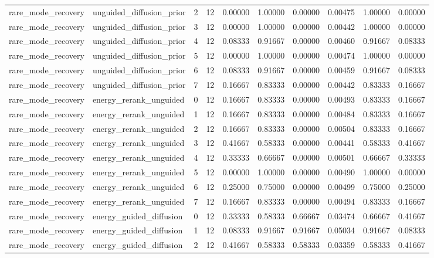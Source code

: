 \documentclass{article}
\begin{document}
\begin{table}[tbp]
{\begin{tabular}{llllllllll}
rare\_mode\_recovery & unguided\_diffusion\_prior & 2 & 12 & 0.00000 & 1.00000 & 0.00000 & 0.00475 & 1.00000 & 0.00000 \\
rare\_mode\_recovery & unguided\_diffusion\_prior & 3 & 12 & 0.00000 & 1.00000 & 0.00000 & 0.00442 & 1.00000 & 0.00000 \\
rare\_mode\_recovery & unguided\_diffusion\_prior & 4 & 12 & 0.08333 & 0.91667 & 0.00000 & 0.00460 & 0.91667 & 0.08333 \\
rare\_mode\_recovery & unguided\_diffusion\_prior & 5 & 12 & 0.00000 & 1.00000 & 0.00000 & 0.00474 & 1.00000 & 0.00000 \\
rare\_mode\_recovery & unguided\_diffusion\_prior & 6 & 12 & 0.08333 & 0.91667 & 0.00000 & 0.00459 & 0.91667 & 0.08333 \\
rare\_mode\_recovery & unguided\_diffusion\_prior & 7 & 12 & 0.16667 & 0.83333 & 0.00000 & 0.00442 & 0.83333 & 0.16667 \\
rare\_mode\_recovery & energy\_rerank\_unguided & 0 & 12 & 0.16667 & 0.83333 & 0.00000 & 0.00493 & 0.83333 & 0.16667 \\
rare\_mode\_recovery & energy\_rerank\_unguided & 1 & 12 & 0.16667 & 0.83333 & 0.00000 & 0.00484 & 0.83333 & 0.16667 \\
rare\_mode\_recovery & energy\_rerank\_unguided & 2 & 12 & 0.16667 & 0.83333 & 0.00000 & 0.00504 & 0.83333 & 0.16667 \\
rare\_mode\_recovery & energy\_rerank\_unguided & 3 & 12 & 0.41667 & 0.58333 & 0.00000 & 0.00441 & 0.58333 & 0.41667 \\
rare\_mode\_recovery & energy\_rerank\_unguided & 4 & 12 & 0.33333 & 0.66667 & 0.00000 & 0.00501 & 0.66667 & 0.33333 \\
rare\_mode\_recovery & energy\_rerank\_unguided & 5 & 12 & 0.00000 & 1.00000 & 0.00000 & 0.00490 & 1.00000 & 0.00000 \\
rare\_mode\_recovery & energy\_rerank\_unguided & 6 & 12 & 0.25000 & 0.75000 & 0.00000 & 0.00499 & 0.75000 & 0.25000 \\
rare\_mode\_recovery & energy\_rerank\_unguided & 7 & 12 & 0.16667 & 0.83333 & 0.00000 & 0.00494 & 0.83333 & 0.16667 \\
rare\_mode\_recovery & energy\_guided\_diffusion & 0 & 12 & 0.33333 & 0.58333 & 0.66667 & 0.03474 & 0.66667 & 0.41667 \\
rare\_mode\_recovery & energy\_guided\_diffusion & 1 & 12 & 0.08333 & 0.91667 & 0.91667 & 0.05034 & 0.91667 & 0.08333 \\
rare\_mode\_recovery & energy\_guided\_diffusion & 2 & 12 & 0.41667 & 0.58333 & 0.58333 & 0.03359 & 0.58333 & 0.41667 \\

\end{tabular}}
\end{table}
\end{document}
